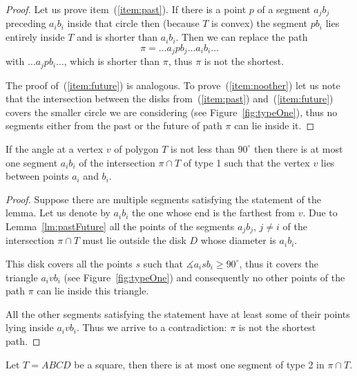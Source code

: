\documentclass[a4paper,11pt]{article}
\begin{document}
\begin{proof} Let us prove item~(\ref{item:past}). If there is a point $p$ of a segment $a_jb_j$ preceding $a_ib_i$ inside that circle then (because $T$ is convex) the segment $pb_i$ lies entirely inside $T$ and is shorter than $a_ib_i$. Then we can replace the path
	\[\pi = \ldots a_jpb_j \ldots a_ib_i \ldots\]
with $\ldots a_jpb_i \ldots$, which is shorter than $\pi$, thus $\pi$ is not the shortest.

	The proof of~(\ref{item:future}) is analogous. To prove~(\ref{item:noother}) let us note that the intersection between the disks from~(\ref{item:past}) and~(\ref{item:future}) covers the smaller circle we are considering (see Figure~\ref{fig:typeOne}), thus no segments either from the past or the future of path $\pi$ can lie inside it.\end{proof}

\begin{figure}[h]
	
\end{figure}

\begin{lemma}
\label{lm:typeOne}
	If the angle at a vertex $v$ of polygon $T$ is not less than $90^\circ$ then there is at most one segment $a_ib_i$ of the intersection $\pi \cap T$ of type 1 such that the vertex $v$ lies between points $a_i$ and $b_i$.
\end{lemma}

\begin{proof} Suppose there are multiple segments satisfying the statement of the lemma. Let us denote by $a_ib_i$ the one whose end is the farthest from $v$. Due to Lemma~\ref{lm:pastFuture} all the points of the segments $a_jb_j$, $j \ne i$ of the intersection $\pi \cap T$ must lie outside the disk $D$ whose diameter is $a_ib_i$.
	
	This disk covers all the points $s$ such that $\measuredangle a_isb_i \ge 90^\circ$, thus it covers the triangle $a_ivb_i$ (see Figure~\ref{fig:typeOne}) and consequently no other points of the path $\pi$ can lie inside this triangle.

	All the other segments satisfying the statement have at least some of their points lying inside $a_ivb_i$. Thus we arrive to a contradiction: $\pi$ is not the shortest path.\end{proof}

\begin{lemma}
\label{lm:squareTypeTwo}
	Let $T = ABCD$ be a square, then there is at most one segment
	of type 2 in $\pi \cap T$.
\end{lemma}
\end{document}
